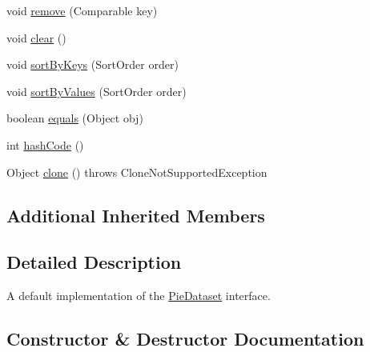 \begin{DoxyCompactItemize}
\item 
void \mbox{\hyperlink{classorg_1_1jfree_1_1data_1_1general_1_1_default_pie_dataset_a48f3593a3f53aa99904b057d13c3467d}{remove}} (Comparable key)
\item 
void \mbox{\hyperlink{classorg_1_1jfree_1_1data_1_1general_1_1_default_pie_dataset_a1b8ef70fb8cb6d1a6f4f6e293ad6fa10}{clear}} ()
\item 
void \mbox{\hyperlink{classorg_1_1jfree_1_1data_1_1general_1_1_default_pie_dataset_a6bbf301f91b8872cb0a23c3905cc7ab3}{sort\+By\+Keys}} (Sort\+Order order)
\item 
void \mbox{\hyperlink{classorg_1_1jfree_1_1data_1_1general_1_1_default_pie_dataset_acda5155e8269c5270125dbf6186b0be9}{sort\+By\+Values}} (Sort\+Order order)
\item 
boolean \mbox{\hyperlink{classorg_1_1jfree_1_1data_1_1general_1_1_default_pie_dataset_af8f24625ba8168f9a73016184858de9d}{equals}} (Object obj)
\item 
int \mbox{\hyperlink{classorg_1_1jfree_1_1data_1_1general_1_1_default_pie_dataset_a0d157479efb57a408a5793d5f453fb3e}{hash\+Code}} ()
\item 
Object \mbox{\hyperlink{classorg_1_1jfree_1_1data_1_1general_1_1_default_pie_dataset_a28025005e529e0b2c3342d1abc0e8dea}{clone}} ()  throws Clone\+Not\+Supported\+Exception 
\end{DoxyCompactItemize}
\subsection*{Additional Inherited Members}


\subsection{Detailed Description}
A default implementation of the \mbox{\hyperlink{interfaceorg_1_1jfree_1_1data_1_1general_1_1_pie_dataset}{Pie\+Dataset}} interface. 

\subsection{Constructor \& Destructor Documentation}
\mbox{\label{classorg_1_1jfree_1_1data_1_1general_1_1_default_pie_dataset_a2f8886ba3847ba732e4e9fd396f091e7}} 

